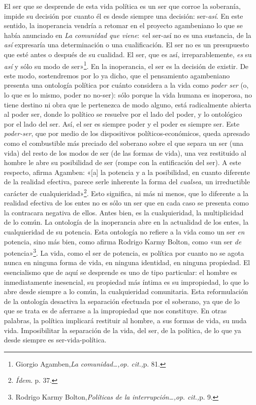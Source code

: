 El ser que se desprende de esta vida política es un ser que corroe la soberanía, impide su decisión por cuanto él es desde siempre una decisión: ser-\emph{así}. En este sentido, la inoperancia vendría a retomar en el proyecto agambeniano lo que se había anunciado en \emph{La comunidad que viene}: «el ser-así no es una sustancia, de la \emph{así} expresaría una determinación o una cualificación. El ser no es un presupuesto que esté antes o después de su cualidad. El ser, que es así, irreparablemente, \emph{es} su \emph{así} y sólo su modo de ser»\footnote{Giorgio Agamben,\emph{La comunidad\ldots,op. cit.,}p. 81.}. En la inoperancia, el ser es la decisión de existir. De este modo, sostendremos por lo ya dicho, que el pensamiento agambeniano presenta una ontología política por cuánto considera a la vida como \emph{poder ser} (o, lo que es lo mismo, poder no no-ser): sólo porque la vida humana es inoperosa, no tiene destino ni obra que le pertenezca de modo alguno, está radicalmente abierta al poder ser, donde lo político se resuelve por el lado del poder, y lo ontológico por el lado del ser. Así, el ser es siempre poder y el poder es siempre ser. Este \emph{poder-ser}, que por medio de los dispositivos políticos-económicos, queda apresado como el combustible más preciado del soberano sobre el que separa un ser (una vida) del resto de los modos de ser (de las formas de vida), una vez restituido al hombre le abre su posibilidad de ser (rompe con la entificación del ser). A este respecto, afirma Agamben: «{[}a{]} la potencia y a la posibilidad, en cuanto diferente de la realidad efectiva, parece serle inherente la forma del \emph{cualsea}, un irreductible carácter de cualquieridad»\footnote{\emph{Ídem}. p. 37.}. Esto significa, ni más ni menos, que lo diferente a la realidad efectiva de los entes no es sólo un ser que en cada caso se presenta como la contracara negativa de ellos. Antes bien, es la cualquieridad, la multiplicidad de lo común. La ontología de la inoperancia abre en la actualidad de los entes, la cualquieridad de su potencia. Esta ontología no refiere a la vida como un ser \emph{en} potencia, sino más bien, como afirma Rodrigo Karmy Bolton, como «un ser \emph{de} potencia»\footnote{Rodrigo Karmy Bolton,\emph{Políticas de la interrupción\ldots,op. cit.,}p. 9.}. La vida, como el ser de potencia, es política por cuanto no se agota nunca en ninguna forma de vida, en ninguna identidad, en ninguna propiedad. El esencialismo que de aquí se desprende es uno de tipo particular: el hombre es inmediatamente inesencial, su propiedad más íntima es su impropiedad, lo que lo abre desde siempre a lo común, la cualquieridad comunitaria. Esta reformulación de la ontología desactiva la separación efectuada por el soberano, ya que de lo que se trata es de aferrarse a la impropiedad que nos constituye. En otras palabras, la política implicará restituir al hombre, a sus formas de vida, su nuda vida. Imposibilitar la separación de la vida, del ser, de la política, de lo que ya desde siempre es ser-vida-política.

